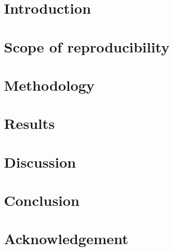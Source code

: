 
\section{Introduction}


\section{Scope of reproducibility}



\label{sec:claims}

\section{Methodology}



\section{Results}
\label{sec:results}


\section{Discussion}


\section{Conclusion}


\section*{Acknowledgement}

